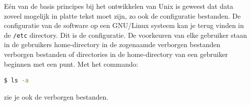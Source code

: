 E\'en van de basis principes bij het ontwikkelen van Unix is geweest dat data zoveel mogelijk in platte tekst moet zijn, zo ook de configuratie bestanden. De configuratie van de software op een GNU/Linux systeem kan je terug vinden in de \texttt{/etc} directory. Dit is de  configuratie. De voorkeuren van elke gebruiker staan in de gebruikers home-directory in de zogenaamde verborgen bestanden verborgen bestanden of directories in de home-directory van een gebruiker beginnen met een punt. Met het commando:
\begin{lstlisting}[language=bash]
$ ls -a
\end{lstlisting}
zie je ook de verborgen bestanden.


